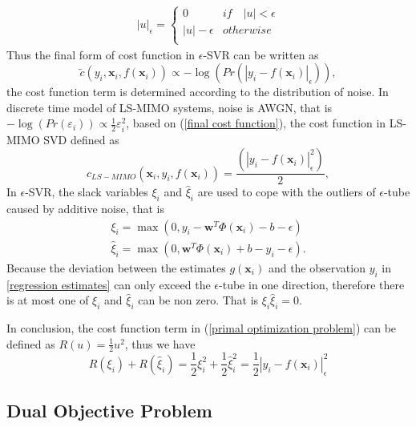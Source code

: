 \begin{eqnarray}
|u|_{\epsilon}=\left\{\begin{array}{ll}
0   &if\quad |u|<\epsilon\\
|u|-\epsilon  &otherwise\\
\end{array}\right.
\label{Vepsilon}
\end{eqnarray}
Thus the final form of cost function in $\epsilon$-SVR can be written as 
\begin{equation}
\tilde{c}(y_{i}, \mathbf{x}_{i}, f(\mathbf{x}_{i}))\varpropto -\log(Pr(|y_{i}-f(\mathbf{x}_{i})|_{\epsilon})),
\label{final cost function}
\end{equation}  
the cost function term is determined according to the distribution of noise. In discrete time model of LS-MIMO systems, noise is AWGN, that is $-\log(Pr(\varepsilon_{i}))\varpropto \frac{1}{2}\varepsilon^{2}_{i}$, based on (\ref{final cost function}), the cost function in LS-MIMO SVD defined as 
\begin{equation}
c_{LS-MIMO}(\mathbf{x}_{i}, y_{i}, f(\mathbf{x}_{i}))=\frac{(|y_{i}-f(\mathbf{x}_{i})|^{2}_{\epsilon})}{2}, 
\label{cost function in LS-MIMO}
\end{equation} 
In $\epsilon$-SVR, the slack variables $\xi_{i}$ and $\hat{\xi}_{i}$ are used to cope with the outliers of $\epsilon$-tube caused by additive noise, that is  
\begin{eqnarray}
\label{definition of slack variable1}
\xi_{i}=\max(0, y_{i}-\mathbf{w}^{T}\Phi(\mathbf{x}_{i})-b-\epsilon)\\
\label{definition of slack variable2}
\hat{\xi}_{i}=\max(0, \mathbf{w}^{T}\Phi(\mathbf{x}_{i})+b-y_{i}-\epsilon).
\end{eqnarray} 
Because the deviation between the estimates $g(\mathbf{x}_{i})$ and the observation $y_{i}$ in \ref{regression estimates} can only exceed the $\epsilon$-tube in one direction, therefore there is at most one of $\xi_{i}$ and $\hat{\xi}_{i}$ can be non zero. That is $\xi_{i}\hat{\xi}_{i}=0$. 

In conclusion, the cost function term in (\ref{primal optimization problem}) can be defined as $R(u)=\frac{1}{2}u^{2}$, thus we have 
\begin{equation}
R(\xi_{i})+R(\hat{\xi}_{i})=\frac{1}{2}\xi^{2}_{i}+\frac{1}{2}\hat{\xi}^{2}_{i}=\frac{1}{2}|y_{i}-f(\mathbf{x}_{i})|^{2}_{\epsilon}
\label{final form of cost function in LS-MIMO}
\end{equation} 
\subsection{Dual Objective Problem}

